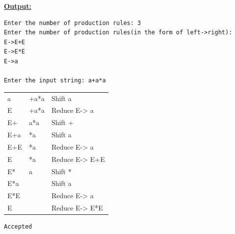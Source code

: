 \documentclass[11pt,a4paper]{article}
\begin{document}
\vspace{0.6em}
\noindent\textbf{\underline{Output:}}\par\vspace{0.4em}
\begin{lstlisting}
Enter the number of production rules: 3
Enter the number of production rules(in the form of left->right):
E->E+E
E->E*E
E->a

Enter the input string: a+a*a
\end{lstlisting}
\vspace{0.2em}
{\setlength{\tabcolsep}{16pt}
\noindent\begin{tabular}{@{}lll@{}}
a & +a*a & Shift a \\
E & +a*a & Reduce E-> a \\
E+ & a*a & Shift + \\
E+a & *a & Shift a \\
E+E & *a & Reduce E-> a \\
E & *a & Reduce E-> E+E \\
E* & a & Shift * \\
E*a & & Shift a \\
E*E & & Reduce E-> a \\
E & & Reduce E-> E*E \\
\end{tabular}}
\vspace{0.4em}
\begin{lstlisting}
Accepted
\end{lstlisting}
\end{document}
